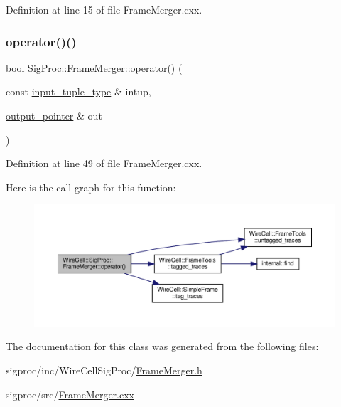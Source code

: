 Definition at line 15 of file Frame\+Merger.\+cxx.

\mbox{\label{class_wire_cell_1_1_sig_proc_1_1_frame_merger_a8869c4f2709ada2d63c9a5bec95cbc5f}} 
\subsubsection{\texorpdfstring{operator()()}{operator()()}}
{\footnotesize\ttfamily bool Sig\+Proc\+::\+Frame\+Merger\+::operator() (\begin{DoxyParamCaption}\item[{const \hyperlink{class_wire_cell_1_1_i_join_node_ae9ca74a75f29555ad20944d585f3b232}{input\+\_\+tuple\+\_\+type} \&}]{intup,  }\item[{\hyperlink{class_wire_cell_1_1_i_join_node_a7af33cc87415e15f0e7db2b083f3def7}{output\+\_\+pointer} \&}]{out }\end{DoxyParamCaption})\hspace{0.3cm}{\ttfamily [virtual]}}



Definition at line 49 of file Frame\+Merger.\+cxx.

Here is the call graph for this function\+:
\nopagebreak
\begin{figure}[H]
\begin{center}
\leavevmode
\includegraphics[width=350pt]{class_wire_cell_1_1_sig_proc_1_1_frame_merger_a8869c4f2709ada2d63c9a5bec95cbc5f_cgraph}
\end{center}
\end{figure}


The documentation for this class was generated from the following files\+:\begin{DoxyCompactItemize}
\item 
sigproc/inc/\+Wire\+Cell\+Sig\+Proc/\hyperlink{_frame_merger_8h}{Frame\+Merger.\+h}\item 
sigproc/src/\hyperlink{_frame_merger_8cxx}{Frame\+Merger.\+cxx}\end{DoxyCompactItemize}
